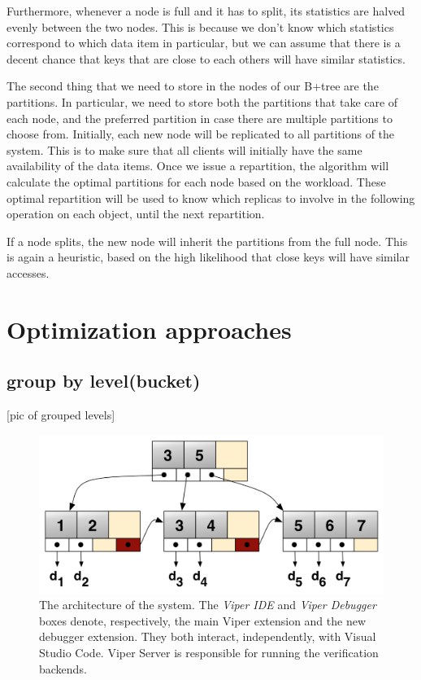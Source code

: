 Furthermore, whenever a node is full and it has to split, its statistics are halved evenly between the two nodes. This is because we don't know which statistics correspond to which data item in particular, but we can assume that there is a decent chance that keys that are close to each others will have similar statistics.

The second thing that we need to store in the nodes of our B+tree are the partitions. In particular, we need to store both the partitions that take care of each node, and the preferred partition in case there are multiple partitions to choose from. Initially, each new node will be replicated to all partitions of the system. This is to make sure that all clients will initially have the same availability of the data items. Once we issue a repartition, the algorithm will calculate the optimal partitions for each node based on the workload. These optimal repartition will be used to know which replicas to involve in the following operation on each object, until the next repartition. 

If a node splits, the new node will inherit the partitions from the full node. This is again a heuristic, based on the high likelihood that close keys will have similar accesses.


\section{Optimization approaches}\label{sec:optimization-approaches}

\subsection{group by level(bucket)}\label{sec:fixed-size buckets}
[pic of grouped levels]
\begin{figure}[htb]
  \centering
  \includegraphics{img/b+tree.png}
  \caption[The architecture of the system]{ The architecture of the system. The
    \textit{Viper IDE} and \textit{Viper Debugger} boxes denote, respectively,
    the main Viper extension and the new debugger extension. They both interact,
    independently, with Visual Studio Code. Viper Server is responsible for
    running the verification backends.}
  \label{fig:b+tree}
\end{figure}

